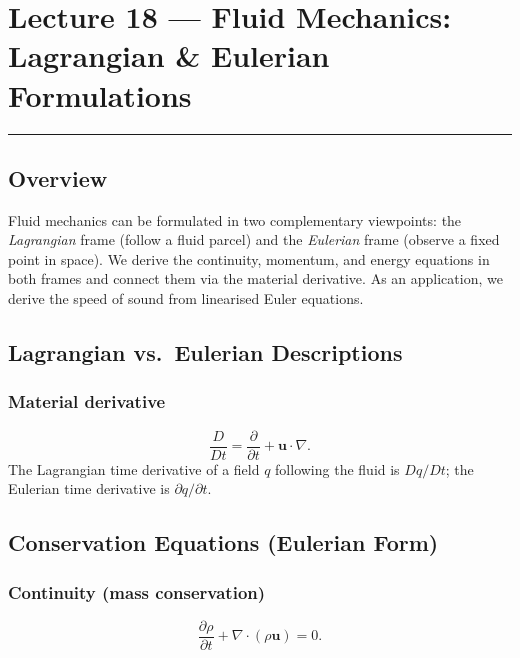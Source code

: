 
\section{Lecture 18 — Fluid Mechanics: Lagrangian \& Eulerian Formulations}\label{sec:lec18}
\hrule\vspace{1.5em}

\subsection*{Overview}
Fluid mechanics can be formulated in two complementary viewpoints:
the \emph{Lagrangian} frame (follow a fluid parcel) and the
\emph{Eulerian} frame (observe a fixed point in space).
We derive the continuity, momentum, and energy equations in both
frames and connect them via the material derivative.  As an
application, we derive the speed of sound from linearised Euler equations.

\subsection{Lagrangian vs.\ Eulerian Descriptions}\label{subsec:lec18:frames}

\subsubsection*{Material derivative}
\begin{equation}
  \frac{D}{Dt} = \frac{\partial}{\partial t} + \mathbf{u}\cdot\nabla.
  \label{eq:lec18:matderiv}
\end{equation}
The Lagrangian time derivative of a field $q$ following the fluid is
$Dq/Dt$; the Eulerian time derivative is $\partial q/\partial t$.

\subsection{Conservation Equations (Eulerian Form)}\label{subsec:lec18:euler}

\subsubsection*{Continuity (mass conservation)}
\begin{equation}
  \frac{\partial \rho}{\partial t} + \nabla\cdot(\rho\mathbf{u}) = 0.
  \label{eq:lec18:cont}
\end{equation}

